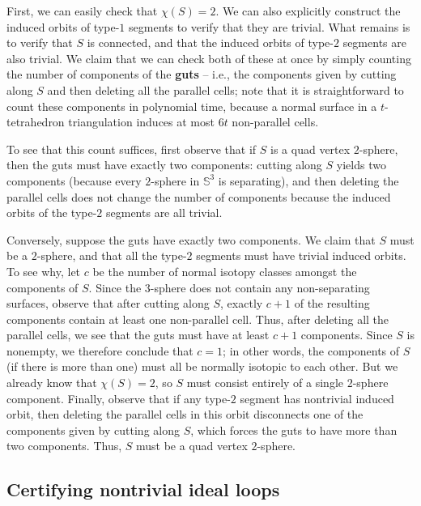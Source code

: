 \documentclass[a4paper,UKenglish,cleveref, autoref, thm-restate]{lipics-v2021}
\begin{document}
First, we can easily check that $\chi(S) = 2$.
We can also explicitly construct the induced orbits of type-$1$ segments to verify that they are trivial.
What remains is to verify that $S$ is connected, and that the induced orbits of type-$2$ segments are also trivial.
We claim that we can check both of these at once by simply counting the number of components of the \textbf{guts} --
i.e., the components given by cutting along $S$ and then deleting all the parallel cells;
note that it is straightforward to count these components in polynomial time, because a normal surface in a $t$-tetrahedron triangulation induces at most $6t$ non-parallel cells.

To see that this count suffices, first observe that if $S$ is a quad vertex $2$-sphere, then the guts must have exactly two components:
cutting along $S$ yields two components (because every $2$-sphere in $\mathbb{S}^3$ is separating), and then deleting the parallel cells does not change
the number of components because the induced orbits of the type-$2$ segments are all trivial.

Conversely, suppose the guts have exactly two components.
We claim that $S$ must be a $2$-sphere, and that all the type-$2$ segments must have trivial induced orbits.
To see why, let $c$ be the number of normal isotopy classes amongst the components of $S$.
Since the $3$-sphere does not contain any non-separating surfaces, observe that after
cutting along $S$, exactly $c+1$ of the resulting components contain at least one non-parallel cell.
Thus, after deleting all the parallel cells, we see that the guts must have at least $c+1$ components.
Since $S$ is nonempty, we therefore conclude that $c=1$;
in other words, the components of $S$ (if there is more than one) must all be normally isotopic to each other.
But we already know that $\chi(S)=2$, so $S$ must consist entirely of a single $2$-sphere component.
Finally, observe that if any type-$2$ segment has nontrivial induced orbit, then deleting the parallel cells in this orbit disconnects one of the components given by cutting along $S$, which forces the guts to have more than two components.
Thus, $S$ must be a quad vertex $2$-sphere.

\subsection{Certifying nontrivial ideal loops}\label{ssec:certifyNontrivial}
\end{document}
